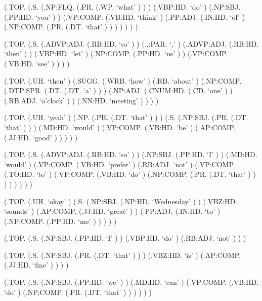 \documentclass[10pt]{article}
\begin{document}
\begin{parsetree}  (.TOP. (.S. (.NP:FLQ. (.PR. (.WP. `what' ) ) ) (.VBP:HD. `do' ) (.NP:SBJ. (.PP:HD. `you' ) ) (.VP:COMP. (.VB:HD. `think' ) (.PP:ADJ. (.IN:HD. `of' ) (.NP:COMP. (.PR. (.DT. `that' ) ) ) ) ) ) ) \end{parsetree}

\begin{parsetree}  (.TOP. (.S. (.ADVP:ADJ. (.RB:HD. `so' ) ) (.,:PAR. `,' ) (.ADVP:ADJ. (.RB:HD. `then' ) ) (.VBP:HD. `let' ) (.NP:COMP. (.PP:HD. `us' ) ) (.VP:COMP. (.VB:HD. `see' ) ) ) ) \end{parsetree}

\begin{parsetree}  (.TOP. (.UH. `then' ) (.SUGG. (.WRB. `how' ) (.RB. `about' ) (.NP:COMP. (.DTP:SPR. (.DT. (.DT. `a' ) ) ) (.NP:ADJ. (.CNUM:HD. (.CD. `one' ) ) (.RB:ADJ. `o'clock' ) ) (.NN:HD. `meeting' ) ) ) ) \end{parsetree}

\begin{parsetree}  (.TOP. (.UH. `yeah' ) (.NP. (.PR. (.DT. `that' ) ) ) (.S. (.NP:SBJ. (.PR. (.DT. `that' ) ) ) (.MD:HD. `would' ) (.VP:COMP. (.VB:HD. `be' ) (.AP:COMP. (.JJ:HD. `good' ) ) ) ) ) \end{parsetree}

\begin{parsetree}  (.TOP. (.S. (.ADVP:ADJ. (.RB:HD. `so' ) ) (.NP:SBJ. (.PP:HD. `I' ) ) (.MD:HD. `would' ) (.VP:COMP. (.VB:HD. `prefer' ) (.RB:ADJ. `not' ) (.VP:COMP. (.TO:HD. `to' ) (.VP:COMP. (.VB:HD. `do' ) (.NP:COMP. (.PR. (.DT. `that' ) ) ) ) ) ) ) ) \end{parsetree}

\begin{parsetree}  (.TOP. (.UH. `okay' ) (.S. (.NP:SBJ. (.NP:HD. `Wednesday' ) ) (.VBZ:HD. `sounds' ) (.AP:COMP. (.JJ:HD. `great' ) ) (.PP:ADJ. (.IN:HD. `to' ) (.NP:COMP. (.PP:HD. `me' ) ) ) ) ) \end{parsetree}

\begin{parsetree}  (.TOP. (.S. (.NP:SBJ. (.PP:HD. `I' ) ) (.VBP:HD. `do' ) (.RB:ADJ. `not' ) ) ) \end{parsetree}

\begin{parsetree}  (.TOP. (.S. (.NP:SBJ. (.PR. (.DT. `that' ) ) ) (.VBZ:HD. `is' ) (.AP:COMP. (.JJ:HD. `fine' ) ) ) ) \end{parsetree}

\begin{parsetree}  (.TOP. (.S. (.NP:SBJ. (.PP:HD. `we' ) ) (.MD:HD. `can' ) (.VP:COMP. (.VB:HD. `do' ) (.NP:COMP. (.PR. (.DT. `that' ) ) ) ) ) ) \end{parsetree}
\end{document}
